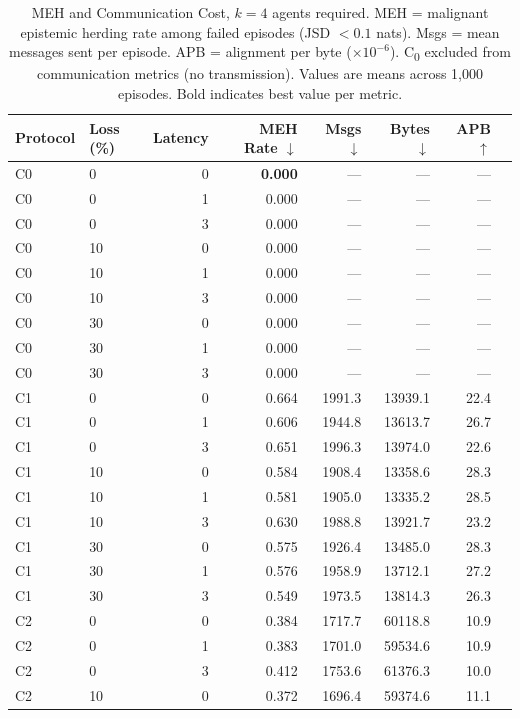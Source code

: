 \documentclass[pdflatex,sn-mathphys-num]{sn-jnl}%
\theoremstyle{thmstyleone}%
\theoremstyle{thmstyletwo}%
\theoremstyle{thmstylethree}%
\begin{document}
\begin{appendices}
\begin{table}
\centering
\caption{MEH and Communication Cost, $k=4$ agents required. MEH = malignant epistemic herding rate among failed episodes (JSD $< 0.1$ nats). Msgs = mean messages sent per episode. APB = alignment per byte ($\times 10^{-6}$). C\textsubscript{0} excluded from communication metrics (no transmission). Values are means across 1,000 episodes. Bold indicates best value per metric.}
\label{tab:appendix_cost_c}
\small
\begin{tabular}{llrrrrrr}
\toprule
Protocol & Loss (\%) & Latency & MEH Rate $\downarrow$ & Msgs $\downarrow$ & Bytes $\downarrow$ & APB $\uparrow$ \\
\midrule
C0 & 0 & 0 & \textbf{0.000} & --- & --- & --- \\
C0 & 0 & 1 & 0.000 & --- & --- & --- \\
C0 & 0 & 3 & 0.000 & --- & --- & --- \\
C0 & 10 & 0 & 0.000 & --- & --- & --- \\
C0 & 10 & 1 & 0.000 & --- & --- & --- \\
C0 & 10 & 3 & 0.000 & --- & --- & --- \\
C0 & 30 & 0 & 0.000 & --- & --- & --- \\
C0 & 30 & 1 & 0.000 & --- & --- & --- \\
C0 & 30 & 3 & 0.000 & --- & --- & --- \\
\addlinespace[4pt]
C1 & 0 & 0 & 0.664 & 1991.3 & 13939.1 & 22.4 \\
C1 & 0 & 1 & 0.606 & 1944.8 & 13613.7 & 26.7 \\
C1 & 0 & 3 & 0.651 & 1996.3 & 13974.0 & 22.6 \\
C1 & 10 & 0 & 0.584 & 1908.4 & 13358.6 & 28.3 \\
C1 & 10 & 1 & 0.581 & 1905.0 & 13335.2 & 28.5 \\
C1 & 10 & 3 & 0.630 & 1988.8 & 13921.7 & 23.2 \\
C1 & 30 & 0 & 0.575 & 1926.4 & 13485.0 & 28.3 \\
C1 & 30 & 1 & 0.576 & 1958.9 & 13712.1 & 27.2 \\
C1 & 30 & 3 & 0.549 & 1973.5 & 13814.3 & 26.3 \\
\addlinespace[4pt]
C2 & 0 & 0 & 0.384 & 1717.7 & 60118.8 & 10.9 \\
C2 & 0 & 1 & 0.383 & 1701.0 & 59534.6 & 10.9 \\
C2 & 0 & 3 & 0.412 & 1753.6 & 61376.3 & 10.0 \\
C2 & 10 & 0 & 0.372 & 1696.4 & 59374.6 & 11.1 \\

\end{tabular}
\end{table}
\end{appendices}
\end{document}
